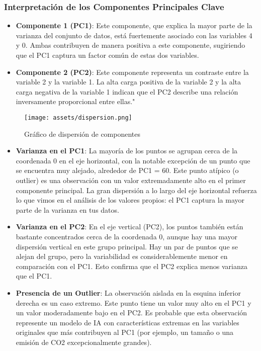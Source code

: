 \documentclass[journal]{IEEEtran}
\begin{document}
	\subsubsection{Interpretación de los Componentes Principales Clave}
	\begin{itemize}
		\item \textbf{Componente 1 (PC1)}: Este componente, que explica la mayor parte de la varianza del conjunto de datos, está fuertemente asociado con las variables 4 y 0. Ambas contribuyen de manera positiva a este componente, sugiriendo que el PC1 captura un factor común de estas dos variables.
		\item \textbf{Componente 2 (PC2)}: Este componente representa un contraste entre la variable 2 y la variable 1. La alta carga positiva de la variable 2 y la alta carga negativa de la variable 1 indican que el PC2 describe una relación inversamente proporcional entre ellas."
	\end{itemize}

	\begin{figure}[H]
		\centering
		\texttt{[image: assets/dispersion.png]}
		\caption{Gráfico de dispersión de componentes}
		\label{fig:pca_scatter}
	\end{figure}
	\begin{itemize}
		\item \textbf{Varianza en el PC1}: La mayoría de los puntos se agrupan cerca de la coordenada 0 en el eje horizontal, con la notable excepción de un punto que se encuentra muy alejado, alrededor de PC1 = 60. Este punto atípico (o outlier) es una observación con un valor extremadamente alto en el primer componente principal. La gran dispersión a lo largo del eje horizontal refuerza lo que vimos en el análisis de los valores propios: el PC1 captura la mayor parte de la varianza en tus datos.
		\item \textbf{Varianza en el PC2}: En el eje vertical (PC2), los puntos también están bastante concentrados cerca de la coordenada 0, aunque hay una mayor dispersión vertical en este grupo principal. Hay un par de puntos que se alejan del grupo, pero la variabilidad es considerablemente menor en comparación con el PC1. Esto confirma que el PC2 explica menos varianza que el PC1.
		\item \textbf{Presencia de un Outlier}:  La observación aislada en la esquina inferior derecha es un caso extremo. Este punto tiene un valor muy alto en el PC1 y un valor moderadamente bajo en el PC2. Es probable que esta observación represente un modelo de IA con características extremas en las variables originales que más contribuyen al PC1 (por ejemplo, un tamaño o una emisión de CO2 excepcionalmente grandes).
	\end{itemize}
\end{document}
